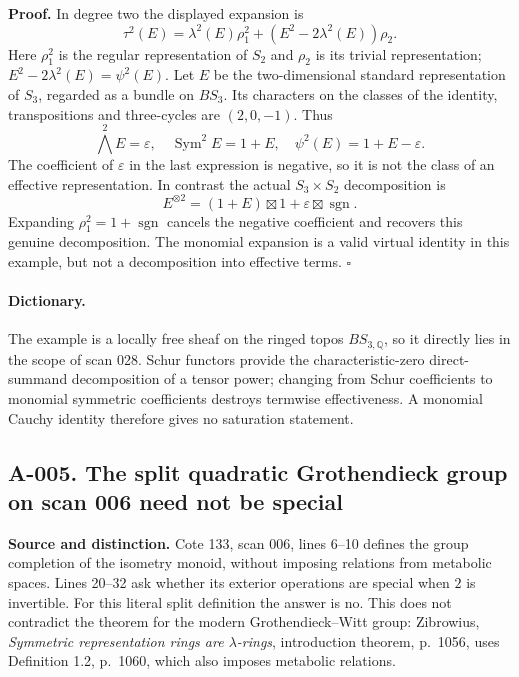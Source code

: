 \documentclass[11pt]{article}
\begin{document}
\textbf{Proof.} In degree two the displayed expansion is
\[
 \tau^2(E)=\lambda^2(E)\rho_1^2+
             (E^2-2\lambda^2(E))\rho_2.
\]
Here $\rho_1^2$ is the regular representation of $S_2$ and $\rho_2$ is its
trivial representation; $E^2-2\lambda^2(E)=\psi^2(E)$.
Let $E$ be the two-dimensional standard representation of $S_3$, regarded
as a bundle on $BS_3$.  Its characters on the classes of the identity,
transpositions and three-cycles are $(2,0,-1)$.  Thus
\[
 \bigwedge^2E=\varepsilon,\quad
 \operatorname{Sym}^2E=1+E,\quad
 \psi^2(E)=1+E-\varepsilon.
\]
The coefficient of $\varepsilon$ in the last expression is negative, so it
is not the class of an effective representation.  In contrast the actual
$S_3\times S_2$ decomposition is
\[
 E^{\otimes2}=(1+E)\boxtimes1+\varepsilon\boxtimes\operatorname{sgn}.
\]
Expanding $\rho_1^2=1+\operatorname{sgn}$ cancels the negative coefficient
and recovers this genuine decomposition.  The monomial expansion is a
valid virtual identity in this example, but not a decomposition into
effective terms. \hfill$\square$

\paragraph{Dictionary.}
The example is a locally free sheaf on the ringed topos $BS_{3,\mathbb Q}$,
so it directly lies in the scope of scan 028.  Schur functors provide the
characteristic-zero direct-summand decomposition of a tensor power; changing
from Schur coefficients to monomial symmetric coefficients destroys
termwise effectiveness.  A monomial Cauchy identity therefore gives no
saturation statement.

\subsection*{A-005. The split quadratic Grothendieck group on scan 006 need not be special}
\textbf{Source and distinction.} Cote 133, scan 006, lines 6--10 defines
the group completion of the isometry monoid, without imposing relations
from metabolic spaces.  Lines 20--32 ask whether its exterior operations
are special when $2$ is invertible.  For this literal split definition the
answer is no.  This does not contradict the theorem for the modern
Grothendieck--Witt group: Zibrowius, \emph{Symmetric representation rings
are $\lambda$-rings}, introduction theorem, p.~1056, uses Definition 1.2,
p.~1060, which also imposes metabolic relations.
\end{document}
